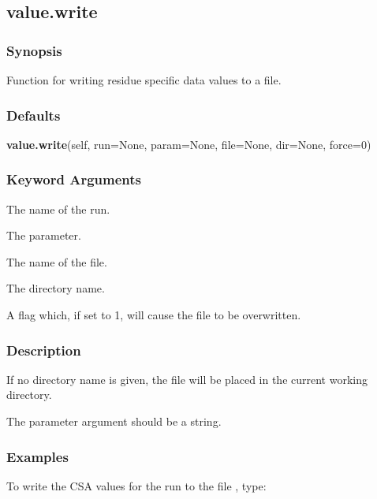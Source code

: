   

 \newpage 

 \subsection{value.write} 

  
 \subsubsection{Synopsis} 

 Function for writing residue specific data values to a file. 
  

  
 \subsubsection{Defaults} 

 \textsf{\textbf{value.write}(self, run=None, param=None, file=None, dir=None, force=0)} 

  
 \subsubsection{Keyword Arguments} 

   The name of the run.   

   The parameter.   

   The name of the file.   

   The directory name.   

   A flag which, if set to 1, will cause the file to be overwritten.  

  

  
 \subsubsection{Description} 

 If no directory name is given, the file will be placed in the current working directory. 
  

 The parameter argument should be a string. 
  

  
 \subsubsection{Examples} 

 To write the CSA values for the run  to the file , type: 
  

